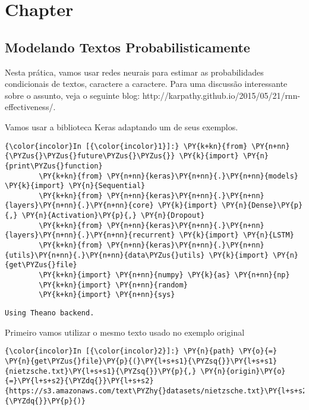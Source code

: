 \chapter{Chapter}

    
    

    
    \section{Modelando Textos
Probabilisticamente}\label{modelando-textos-probabilisticamente}

Nesta prática, vamos usar redes neurais para estimar as probabilidades
condicionais de textos, caractere a caractere. Para uma discussão
interessante sobre o assunto, veja o seguinte blog:
http://karpathy.github.io/2015/05/21/rnn-effectiveness/.

Vamos usar a biblioteca Keras adaptando um de seus exemplos.

    \begin{Verbatim}[commandchars=\\\{\}]
{\color{incolor}In [{\color{incolor}1}]:} \PY{k+kn}{from} \PY{n+nn}{\PYZus{}\PYZus{}future\PYZus{}\PYZus{}} \PY{k}{import} \PY{n}{print\PYZus{}function}
        \PY{k+kn}{from} \PY{n+nn}{keras}\PY{n+nn}{.}\PY{n+nn}{models} \PY{k}{import} \PY{n}{Sequential}
        \PY{k+kn}{from} \PY{n+nn}{keras}\PY{n+nn}{.}\PY{n+nn}{layers}\PY{n+nn}{.}\PY{n+nn}{core} \PY{k}{import} \PY{n}{Dense}\PY{p}{,} \PY{n}{Activation}\PY{p}{,} \PY{n}{Dropout}
        \PY{k+kn}{from} \PY{n+nn}{keras}\PY{n+nn}{.}\PY{n+nn}{layers}\PY{n+nn}{.}\PY{n+nn}{recurrent} \PY{k}{import} \PY{n}{LSTM}
        \PY{k+kn}{from} \PY{n+nn}{keras}\PY{n+nn}{.}\PY{n+nn}{utils}\PY{n+nn}{.}\PY{n+nn}{data\PYZus{}utils} \PY{k}{import} \PY{n}{get\PYZus{}file}
        \PY{k+kn}{import} \PY{n+nn}{numpy} \PY{k}{as} \PY{n+nn}{np}
        \PY{k+kn}{import} \PY{n+nn}{random}
        \PY{k+kn}{import} \PY{n+nn}{sys}
\end{Verbatim}

    \begin{Verbatim}[commandchars=\\\{\}]
Using Theano backend.

    \end{Verbatim}

    Primeiro vamos utilizar o mesmo texto usado no exemplo original

    \begin{Verbatim}[commandchars=\\\{\}]
{\color{incolor}In [{\color{incolor}2}]:} \PY{n}{path} \PY{o}{=} \PY{n}{get\PYZus{}file}\PY{p}{(}\PY{l+s+s1}{\PYZsq{}}\PY{l+s+s1}{nietzsche.txt}\PY{l+s+s1}{\PYZsq{}}\PY{p}{,} \PY{n}{origin}\PY{o}{=}\PY{l+s+s2}{\PYZdq{}}\PY{l+s+s2}{https://s3.amazonaws.com/text\PYZhy{}datasets/nietzsche.txt}\PY{l+s+s2}{\PYZdq{}}\PY{p}{)}
\end{Verbatim}

